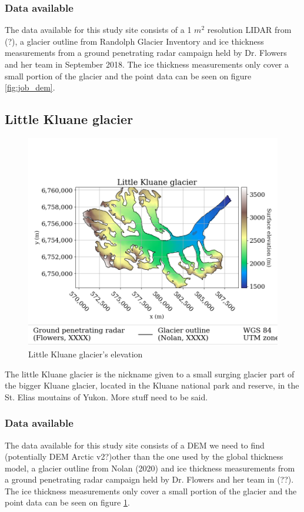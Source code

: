 \documentclass[a4, 12pt]{article}
\begin{document}
\subsubsection{Data available} %
The data available for this study site consists of a 1 $m^2$ resolution LIDAR from (?), a glacier outline from Randolph Glacier Inventory and ice thickness measurements from a ground penetrating radar campaign held by Dr. Flowers and her team in September 2018. The ice thickness measurements only cover a small portion of the glacier and the point data can be seen on figure \ref{fig:job_dem}.\\

\subsection{Little Kluane glacier}
\begin{figure}[h!]
\centering
\includegraphics[scale=0.5]{../job_kluane_maps/Little Kluane glacier_elevation.png}
\caption{Little Kluane glacier's elevation}
\label{fig:lk_dem}
\end{figure}
The little Kluane glacier is the nickname given to a small surging glacier part of the bigger Kluane glacier, located in the Kluane national park and reserve, in the St. Elias moutains of Yukon. More stuff need to be said.
\subsubsection{Data available}
The data available for this study site consists of a DEM we need to find (potentially DEM Arctic v2?)other than the one used by the global thickness model, a glacier outline from Nolan (2020) and ice thickness measurements from a ground penetrating radar campaign held by Dr. Flowers and her team in (??). The ice thickness measurements only cover a small portion of the glacier and the point data can be seen on figure \ref{fig:lk_dem}.
\end{document}

